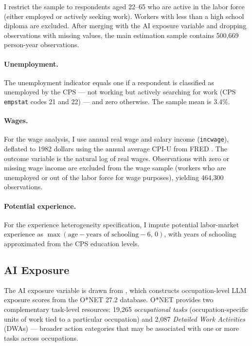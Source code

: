 \documentclass[11pt]{article}
\theoremstyle{plain}
\theoremstyle{remark}
\begin{document}
I restrict the sample to respondents aged 22--65 who are active in the labor force (either employed or actively seeking work). Workers with less than a high school diploma are excluded. After merging with the AI exposure variable and dropping observations with missing values, the main estimation sample contains 500,669 person-year observations.

\paragraph{Unemployment.} The unemployment indicator equals one if a respondent is classified as unemployed by the CPS --- not working but actively searching for work (CPS \texttt{empstat} codes 21 and 22) --- and zero otherwise. The sample mean is 3.4\%.

\paragraph{Wages.} For the wage analysis, I use annual real wage and salary income (\texttt{incwage}), deflated to 1982 dollars using the annual average CPI-U from FRED \parencite{fred_cpiaucsl}. The outcome variable is the natural log of real wages. Observations with zero or missing wage income are excluded from the wage sample (workers who are unemployed or out of the labor force for wage purposes), yielding 464,300 observations.

\paragraph{Potential experience.} For the experience heterogeneity specification, I impute potential labor-market experience as $\max(\text{age} - \text{years of schooling} - 6,\, 0)$, with years of schooling approximated from the CPS education levels.

\subsection{AI Exposure}

The AI exposure variable is drawn from \textcite{eloundou2024gpts}, which constructs occupation-level LLM exposure scores from the O*NET 27.2 database. O*NET provides two complementary task-level resources: 19,265 \textit{occupational tasks} (occupation-specific units of work tied to a particular occupation) and 2,087 \textit{Detailed Work Activities} (DWAs) --- broader action categories that may be associated with one or more tasks across occupations.
\end{document}
